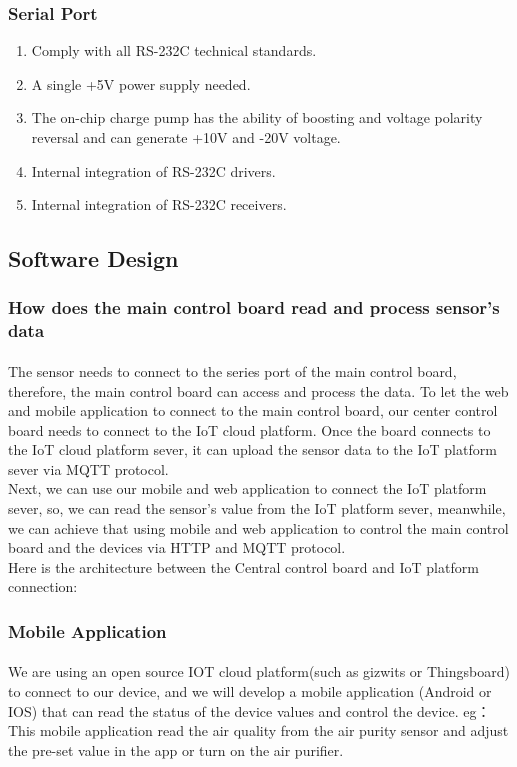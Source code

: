 \documentclass[a4paper,12pt]{article}
\begin{document}
\subsubsection{Serial Port}
\begin{enumerate}[lable=(\alph*)]
\item	Comply with all RS-232C technical standards.
\item	A single +5V power supply needed.
\item	The on-chip charge pump has the ability of boosting and voltage polarity reversal and can generate +10V and -20V voltage.
\item	Internal integration of RS-232C drivers.
\item	Internal integration of RS-232C receivers.
\end{enumerate}

\subsection{Software Design}
\subsubsection{How does the main control board read and process sensor's data}
\paragraph{}
The sensor needs to connect to the series port of the main control board, therefore, the main control board can access and process the data.
To let the web and mobile application to connect to the main control board, our center control board needs to connect to the IoT cloud platform. Once the board connects to the IoT cloud platform sever, it can upload the sensor data to the IoT platform sever via MQTT protocol. \\
Next, we can use our mobile and web application to connect the IoT platform sever, so, we can read the sensor's value from the IoT platform sever, meanwhile, we can achieve that using mobile and web application to control the main control board and the devices via HTTP and MQTT protocol. \\
Here is the architecture between the Central control board and IoT platform connection:\\
\subsubsection{Mobile Application}
\paragraph{}
We are using an open source IOT cloud platform(such as gizwits or Thingsboard) to connect to our device, and we will develop a mobile application (Android or IOS) that can read the status of the device values and control the device. eg：This mobile application read the air quality from the air purity sensor and adjust the pre-set value in the app or turn on the air purifier.
\end{document}

